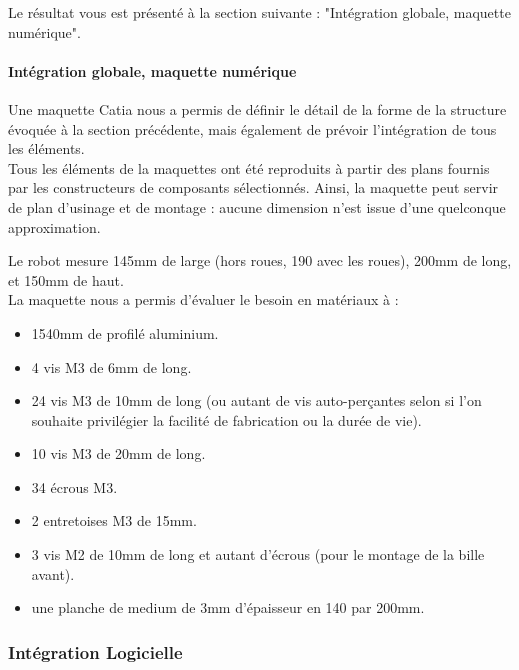 			Le résultat vous est présenté à la section suivante : "Intégration globale, maquette numérique".

		\paragraph{Intégration globale, maquette numérique}

			Une maquette Catia nous a permis de définir le détail de la forme de la structure évoquée à la section précédente, mais également de prévoir l'intégration de tous les éléments.\\

			Tous les éléments de la maquettes ont été reproduits à partir des plans fournis par les constructeurs de composants sélectionnés. Ainsi, la maquette peut servir de plan d'usinage et de montage : aucune dimension n'est issue d'une quelconque approximation.

			\vspace{30pt}


			Le robot mesure 145mm de large (hors roues, 190 avec les roues), 200mm de long, et 150mm de haut.\\

			La maquette nous a permis d'évaluer le besoin en matériaux à :

			\begin{itemize}
				\item 1540mm de profilé aluminium.
				\item 4 vis M3 de 6mm de long.
				\item 24 vis M3 de 10mm de long (ou autant de vis auto-perçantes selon si l'on souhaite privilégier la facilité de fabrication ou la durée de vie).
				\item 10 vis M3 de 20mm de long.
				\item 34 écrous M3.
				\item 2 entretoises M3 de 15mm.
				\item 3 vis M2 de 10mm de long et autant d'écrous (pour le montage de la bille avant).
				\item une planche de medium de 3mm d'épaisseur en 140 par 200mm.
			\end{itemize}

	\subsubsection{Intégration Logicielle}\label{integrationLogicielle}

